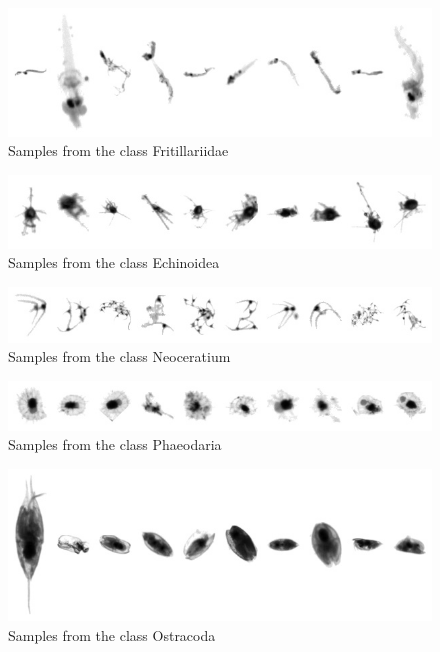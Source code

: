\begin{figure}[h]
\includegraphics[width=\columnwidth]{collage/066_Fritillariidae.jpg}\caption{Samples from the class Fritillariidae }
\end{figure}
\begin{figure}[h]
\includegraphics[width=\columnwidth]{collage/067_Echinoidea.jpg}\caption{Samples from the class Echinoidea }
\end{figure}
\begin{figure}[h]
\includegraphics[width=\columnwidth]{collage/068_Neoceratium.jpg}\caption{Samples from the class Neoceratium }
\end{figure}
\begin{figure}[h]
\includegraphics[width=\columnwidth]{collage/069_Phaeodaria.jpg}\caption{Samples from the class Phaeodaria }
\end{figure}
\begin{figure}[h]
\includegraphics[width=\columnwidth]{collage/070_Ostracoda.jpg}\caption{Samples from the class Ostracoda }
\end{figure}

